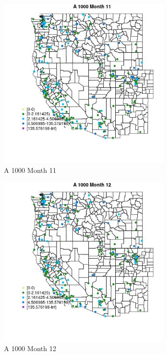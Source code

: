 \begin{figure} 
\centering  
\includegraphics[width=0.77\textwidth]{Code_Outputs/Report_ML_input_PM25_Step4_part_e_de_duplicated_aveswNAs_MapObsMo11A_1000.jpg} 
\caption{\label{fig:Report_ML_input_PM25_Step4_part_e_de_duplicated_aveswNAsMapObsMo11A_1000}A 1000 Month 11} 
\end{figure} 
 

\begin{figure} 
\centering  
\includegraphics[width=0.77\textwidth]{Code_Outputs/Report_ML_input_PM25_Step4_part_e_de_duplicated_aveswNAs_MapObsMo12A_1000.jpg} 
\caption{\label{fig:Report_ML_input_PM25_Step4_part_e_de_duplicated_aveswNAsMapObsMo12A_1000}A 1000 Month 12} 
\end{figure} 
 

